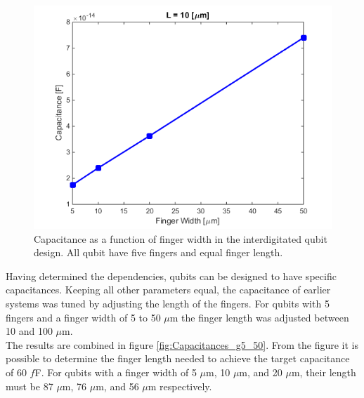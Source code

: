 \begin{figure}
	\centering
	\includegraphics[scale = 0.7]{Figures/Capacitance_Plots/CapVSWidthL10.png}
	\caption{Capacitance as a function of finger width in the interdigitated qubit design. All qubit have five fingers and equal finger length.}
	\label{fig:CapVSWidthL10}
\end{figure}

Having determined the dependencies, qubits can be designed to have specific capacitances. Keeping all other parameters equal, the capacitance of earlier systems was tuned by adjusting the length of the fingers. For qubits with 5 fingers and a finger width of 5 to 50 \(\mu\)m the finger length was adjusted between 10 and 100 \(\mu\)m. \\
The results are combined in figure \ref{fig:Capacitances_g5_50}. From the figure it is possible to determine the finger length needed to achieve the target capacitance of 60 \(f\)F. For qubits with a finger width of  5 \(\mu\)m, 10 \(\mu\)m, and 20 \(\mu\)m, their length must be 87 \(\mu\)m, 76 \(\mu\)m, and 56 \(\mu\)m  respectively.   

